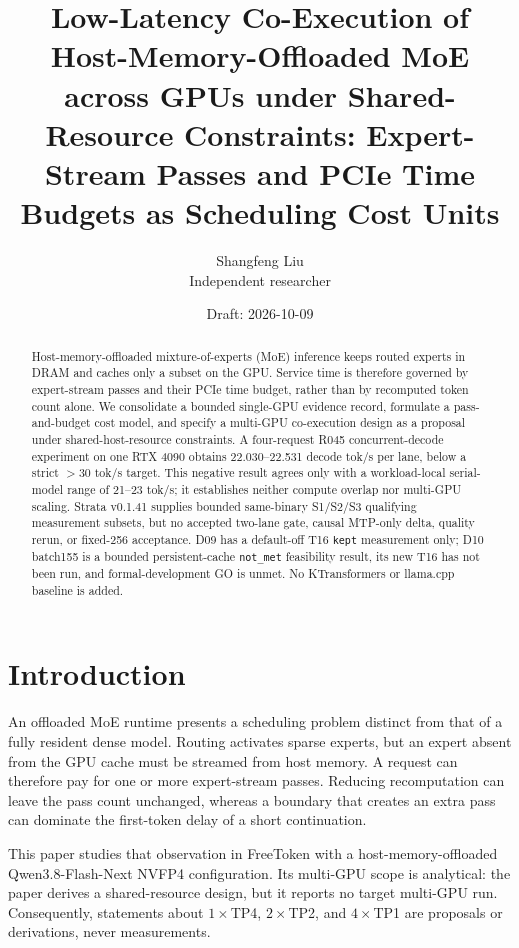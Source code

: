 \documentclass[11pt]{article}
\title{Low-Latency Co-Execution of Host-Memory-Offloaded MoE across GPUs under Shared-Resource Constraints: Expert-Stream Passes and PCIe Time Budgets as Scheduling Cost Units}
\author{Shangfeng Liu\\Independent researcher}
\date{Draft: 2026-10-09}
\begin{document}
\maketitle

\begin{abstract}
Host-memory-offloaded mixture-of-experts (MoE) inference keeps routed experts in DRAM and caches only a subset on the GPU. Service time is therefore governed by expert-stream passes and their PCIe time budget, rather than by recomputed token count alone. We consolidate a bounded single-GPU evidence record, formulate a pass-and-budget cost model, and specify a multi-GPU co-execution design as a proposal under shared-host-resource constraints. A four-request R045 concurrent-decode experiment on one RTX 4090 obtains 22.030--22.531 decode tok/s per lane, below a strict $>30$ tok/s target. This negative result agrees only with a workload-local serial-model range of 21--23 tok/s; it establishes neither compute overlap nor multi-GPU scaling. Strata v0.1.41 supplies bounded same-binary S1/S2/S3 qualifying measurement subsets, but no accepted two-lane gate, causal MTP-only delta, quality rerun, or fixed-256 acceptance. D09 has a default-off T16 \texttt{kept} measurement only; D10 batch155 is a bounded persistent-cache \texttt{not\_met} feasibility result, its new T16 has not been run, and formal-development GO is unmet. No KTransformers or llama.cpp baseline is added.
\end{abstract}

\section{Introduction}

An offloaded MoE runtime presents a scheduling problem distinct from that of a fully resident dense model. Routing activates sparse experts, but an expert absent from the GPU cache must be streamed from host memory. A request can therefore pay for one or more expert-stream passes. Reducing recomputation can leave the pass count unchanged, whereas a boundary that creates an extra pass can dominate the first-token delay of a short continuation.

This paper studies that observation in FreeToken with a host-memory-offloaded Qwen3.8-Flash-Next NVFP4 configuration. Its multi-GPU scope is analytical: the paper derives a shared-resource design, but it reports no target multi-GPU run. Consequently, statements about $1\times$TP4, $2\times$TP2, and $4\times$TP1 are proposals or derivations, never measurements.
\end{document}
